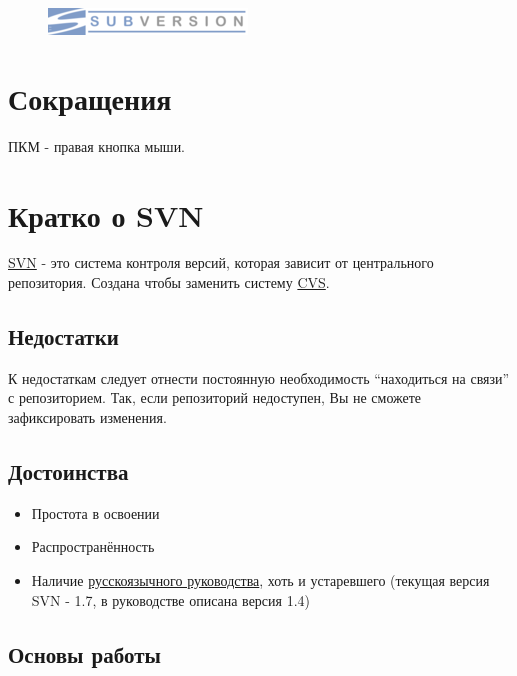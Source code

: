 \documentclass[a4paper,12pt]{article}
\begin{document}
\thispagestyle{empty}

\begin{figure}[h]
	\centering
	\includegraphics[scale=0.60]{title.png}
\end{figure}
\clearpage

\tableofcontents 
\clearpage

\section{Сокращения}

ПКМ - правая кнопка мыши.
\clearpage

\section{Кратко о SVN}
\setcounter{figure}{0}
\href{http://www.subversion.apache.org/}{SVN} - это система контроля версий,
которая зависит от центрального репозитория. Создана чтобы заменить систему
\href{http://www.nongnu.org/cvs/}{CVS}.

\subsection{Недостатки}

К недостаткам следует отнести постоянную необходимость ``находиться на
связи'' с репозиторием. Так, если репозиторий недоступен, Вы не сможете
зафиксировать изменения.

\subsection{Достоинства}

\begin{itemize}
\item
  Простота в освоении
\item
  Распространённость
\item
  Наличие
  \href{http://svnbook.red-bean.com/nightly/ru/svn-book.html}{русскоязычного
  руководства}, хоть и устаревшего (текущая версия SVN - 1.7, в
  руководстве описана версия 1.4) 
\end{itemize}
\clearpage
\subsection{Основы работы}
\end{document}
